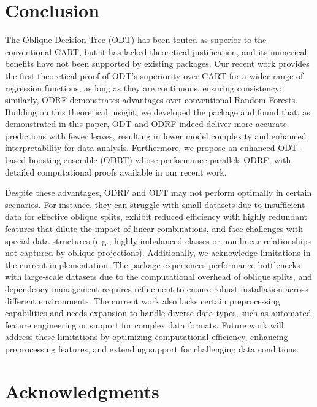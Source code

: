 \section{Conclusion}\label{sec:conclusion}
The Oblique Decision Tree (ODT) has been touted as superior to the conventional CART, but it has lacked theoretical justification, and its numerical benefits have not been supported by existing packages. Our recent work \citep{zhan2022consistency} provides the first theoretical proof of ODT's superiority over CART for a wider range of regression functions, as long as they are continuous, ensuring consistency; similarly, ODRF demonstrates advantages over conventional Random Forests. Building on this theoretical insight, we developed the  package and found that, as demonstrated in this paper, ODT and ODRF indeed deliver more accurate predictions with fewer leaves,  resulting in lower model complexity and enhanced interpretability for data analysis. Furthermore, we propose an enhanced ODT-based boosting ensemble (ODBT) whose performance parallels ODRF, with detailed computational proofs available in our recent work. %

{
Despite these advantages, ODRF and ODT may not perform optimally in certain scenarios. For instance, they can struggle with small datasets due to insufficient data for effective oblique splits, exhibit reduced efficiency with highly redundant features that dilute the impact of linear combinations, and face challenges with special data structures (e.g., highly imbalanced classes or non-linear relationships not captured by oblique projections). Additionally, we acknowledge limitations in the current implementation. The package experiences performance bottlenecks with large-scale datasets due to the computational overhead of oblique splits, and dependency management requires refinement to ensure robust installation across different environments. The current work also lacks certain preprocessing capabilities and needs expansion to handle diverse data types, such as automated feature engineering or support for complex data formats. Future work will address these limitations by optimizing computational efficiency, enhancing preprocessing features, and extending support for challenging data conditions.
}

\section{Acknowledgments}


